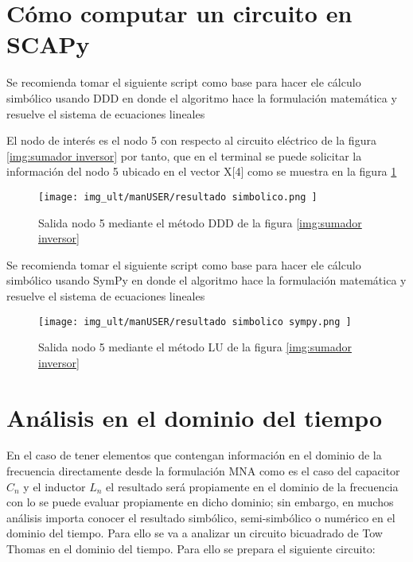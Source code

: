 \newpage

\section{Cómo computar un circuito en SCAPy} 
Se recomienda tomar el siguiente script como base para hacer ele cálculo simbólico usando DDD en donde el algoritmo hace la formulación matemática y resuelve el sistema de ecuaciones lineales




El nodo de interés es el nodo 5 con respecto al circuito eléctrico de la figura \ref{img:sumador inversor} por tanto, que en el terminal se puede solicitar la información del nodo 5 ubicado en el vector X[4] como se muestra en la figura \ref{img:output analisis simbolico}

\begin{figure}[H]
	\centering\texttt{[image: img\_ult/manUSER/resultado simbolico.png
	]}
	\caption{Salida nodo 5 mediante el método DDD de la figura \ref{img:sumador inversor}}
	\label{img:output analisis simbolico}
\end{figure} 


Se recomienda tomar el siguiente script como base para hacer ele cálculo simbólico usando SymPy en donde el algoritmo hace la formulación matemática y resuelve el sistema de ecuaciones lineales




\begin{figure}[H]
	\centering\texttt{[image: img\_ult/manUSER/resultado simbolico sympy.png
	]}
	\caption{Salida nodo 5 mediante el método LU de la figura \ref{img:sumador inversor}}
	\label{img:output analisis simbolico 2}
\end{figure} 

\section{Análisis en el dominio del tiempo}
En el caso de tener elementos que contengan información en el dominio de la frecuencia directamente desde la formulación MNA como es el caso del capacitor $C_{n}$ y el inductor $L_{n}$ el resultado será propiamente en el dominio de la frecuencia con lo se puede evaluar propiamente en dicho dominio; sin embargo, en muchos análisis importa conocer el resultado simbólico, semi-simbólico o numérico en el dominio del tiempo. Para ello se va a analizar un circuito bicuadrado de Tow Thomas en el dominio del tiempo. Para ello se prepara el siguiente circuito: 

